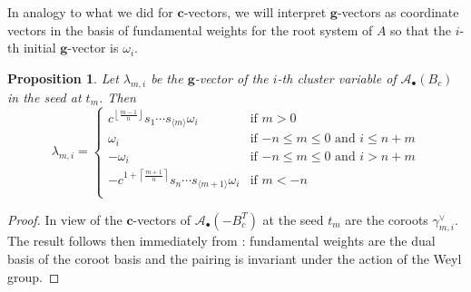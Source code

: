 \documentclass[12pt]{amsart}
\newcommand{\cAb}{\mathcal{A}_\bullet}
\newcommand{\bfc}{\mathbf{c}}
\newcommand{\bfg}{\mathbf{g}}
\renewcommand{\mod}[1]{\langle {#1} \rangle}
\newtheorem{proposition}[theorem]{Proposition}
\numberwithin{equation}{section}
\begin{document}
In analogy to what we did for $\bfc$-vectors, we will interpret $\bfg$-vectors as coordinate vectors in the basis of fundamental weights for the root system of $A$ so that the $i$-th initial $\bfg$-vector is $\omega_i$.
\begin{proposition}
  \label{prop:g-vectors}
  Let $\lambda_{m,i}$ be the $\bfg$-vector of the $i$-th cluster variable of $\cAb(B_c)$ in the seed at $t_m$. 
  Then
  \begin{equation}
    \lambda_{m,i}
    =
    \begin{cases}
      c^{\left\lfloor\frac{m-1}{n}\right\rfloor}s_1\cdots s_{\mod{m}} \omega_i & \text{if $m>0$}\\
      \omega_i & \text{if $-n\leq m \leq 0$ and  $i\leq n+m$} \\
      -\omega_i & \text{if $-n\leq m \leq 0$ and $i>n+m$} \\
      -c^{1+\left\lceil\frac{m+1}{n}\right\rceil}s_n\cdots s_{\mod{m+1}} \omega_i & \text{if $m <-n$}\\
    \end{cases}
  \end{equation}
\end{proposition}

\begin{proof}
  In view of  the $\bfc$-vectors of $\cAb(-B_c^T)$ at the seed $t_m$ are the coroots $\gamma_{m,i}^\vee$.
  The result follows then immediately from \cite[Theorem 1.2]{NZ12}: fundamental weights are the dual basis of the coroot basis and the pairing is invariant under the action of the Weyl group.
\end{proof}
\end{document}
